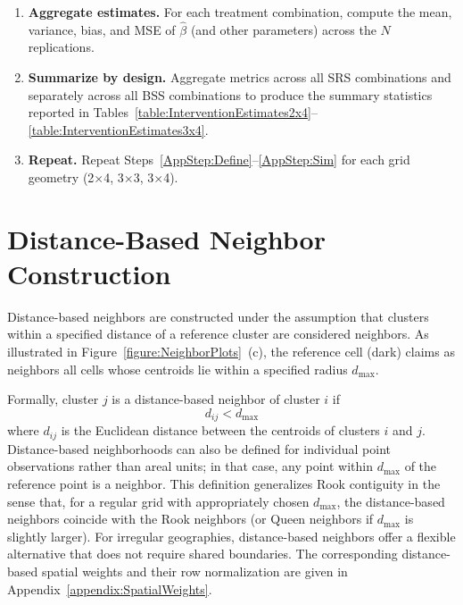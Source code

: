 \documentclass{article}[11pt]
\begin{document}
\begin{enumerate}
    \item \textbf{Aggregate estimates.} For each treatment combination, compute the mean, variance, bias, and MSE of $\hat\beta$ (and other parameters) across the $N$ replications.

    \item \textbf{Summarize by design.} Aggregate metrics across all SRS combinations and separately across all BSS combinations to produce the summary statistics reported in Tables~\ref{table:InterventionEstimates2x4}--\ref{table:InterventionEstimates3x4}.

    \item\label{AppStep:Repeat} \textbf{Repeat.} Repeat Steps~\ref{AppStep:Define}--\ref{AppStep:Sim} for each grid geometry (2$\times$4, 3$\times$3, 3$\times$4).
\end{enumerate}

\section{Distance-Based Neighbor Construction}\label{appendix:DistanceBased}

Distance-based neighbors\cite{fotheringham_sage_2009} are constructed under the assumption that clusters within a specified distance of a reference cluster are considered neighbors. As illustrated in Figure~\ref{figure:NeighborPlots}~(c), the reference cell (dark) claims as neighbors all cells whose centroids lie within a specified radius $d_{\max}$.

Formally, cluster $j$ is a distance-based neighbor of cluster $i$ if
\begin{equation*}
    d_{ij} < d_{\max}
\end{equation*}
where $d_{ij}$ is the Euclidean distance between the centroids of clusters $i$ and $j$. Distance-based neighborhoods can also be defined for individual point observations rather than areal units; in that case, any point within $d_{\max}$ of the reference point is a neighbor. This definition generalizes Rook contiguity in the sense that, for a regular grid with appropriately chosen $d_{\max}$, the distance-based neighbors coincide with the Rook neighbors (or Queen neighbors if $d_{\max}$ is slightly larger). For irregular geographies, distance-based neighbors offer a flexible alternative that does not require shared boundaries. The corresponding distance-based spatial weights and their row normalization are given in Appendix~\ref{appendix:SpatialWeights}.
\end{document}

